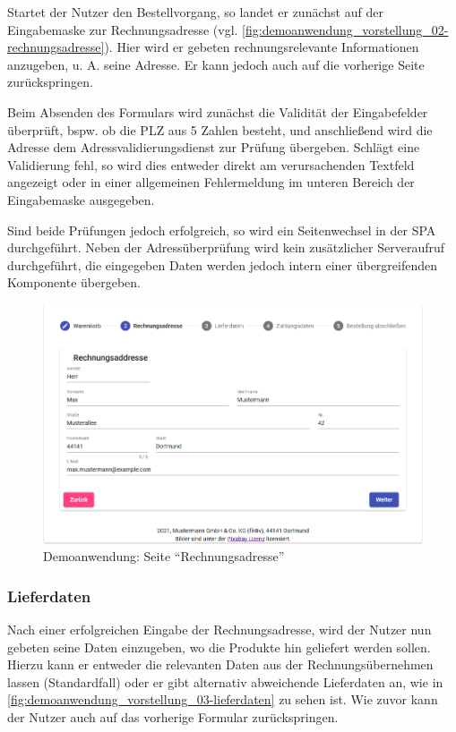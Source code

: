 Startet der Nutzer den Bestellvorgang, so landet er zunächst auf der Eingabemaske zur Rechnungsadresse (vgl. \autoref{fig:demoanwendung_vorstellung_02-rechnungsadresse}). Hier wird er gebeten rechnungsrelevante Informationen anzugeben, u. A. seine Adresse. Er kann jedoch auch auf die vorherige Seite zurückspringen.

Beim Absenden des Formulars wird zunächst die Validität der Eingabefelder überprüft, bspw. ob die PLZ aus 5 Zahlen besteht, und anschließend wird die Adresse dem Adressvalidierungsdienst zur Prüfung übergeben. Schlägt eine Validierung fehl, so wird dies entweder direkt am verursachenden Textfeld angezeigt oder in einer allgemeinen Fehlermeldung im unteren Bereich der Eingabemaske ausgegeben.

Sind beide Prüfungen jedoch erfolgreich, so wird ein Seitenwechsel in der SPA durchgeführt. Neben der Adressüberprüfung wird kein zusätzlicher Serveraufruf durchgeführt, die eingegeben Daten werden jedoch intern einer übergreifenden Komponente übergeben.

\begin{figure}[H]
	\centering
	\includegraphics[width=1.00\linewidth]{img/04_erstellung-poc/demoanwendung_vorstellung_02-rechnungsadresse.png}
	\caption{Demoanwendung: Seite \enquote{Rechnungsadresse}}
	\label{fig:demoanwendung_vorstellung_02-rechnungsadresse}
\end{figure}

\newpage

\subsubsection{Lieferdaten}

Nach einer erfolgreichen Eingabe der Rechnungsadresse, wird der Nutzer nun gebeten seine Daten einzugeben, wo die Produkte hin geliefert werden sollen. Hierzu kann er entweder die relevanten Daten aus der Rechnungsübernehmen lassen (Standardfall) oder er gibt alternativ abweichende Lieferdaten an, wie in \autoref{fig:demoanwendung_vorstellung_03-lieferdaten} zu sehen ist. Wie zuvor kann der Nutzer auch auf das vorherige Formular zurückspringen.


